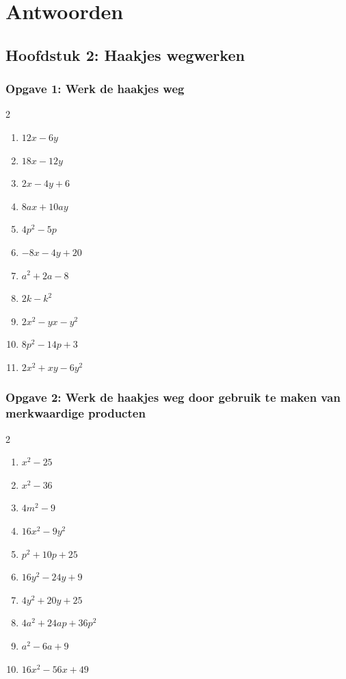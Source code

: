 \chapter{Antwoorden}
\label{chap:antwoorden}

\section{Hoofdstuk 2: Haakjes wegwerken}
\subsection*{Opgave 1: Werk de haakjes weg}
\begin{multicols}{2}
\begin{enumerate}[label=\alph*)]
    \item $12x - 6y$
    \item $18x - 12y$
    \item $2x - 4y + 6$
    \item $8ax + 10ay$
    \item $4p^{2} - 5p$
    \item $-8x - 4y + 20$
    \item $a^2 + 2a - 8$
    \item $2k - k^2$
    \item $2x^{2} - yx - y^{2}$
    \item $8p^{2} - 14p + 3$
    \item $2x^{2} + xy - 6y^{2}$
\end{enumerate}
\end{multicols}

\subsection*{Opgave 2: Werk de haakjes weg door gebruik te maken van merkwaardige producten}
\begin{multicols}{2}
\begin{enumerate}[label=\alph*)]
    \item $x^{2} - 25$
    \item $x^{2} - 36$
    \item $4m^{2} - 9$
    \item $16x^{2} - 9y^{2}$
    \item $p^2 + 10p + 25$
    \item $16y^{2} - 24y + 9$
    \item $4y^{2} + 20y + 25$
    \item $4a^{2} + 24ap + 36p^{2}$
    \item $a^2 - 6a + 9$
    \item $16x^{2} - 56x + 49$
\end{enumerate}
\end{multicols}

